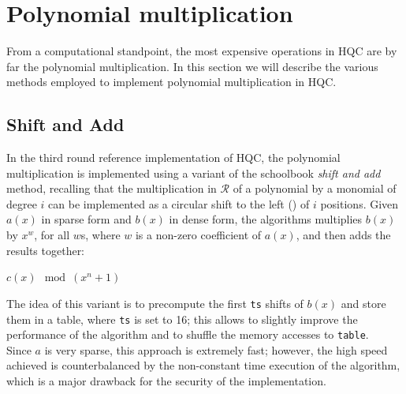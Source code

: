 \section{Polynomial multiplication}
From a computational standpoint, the most expensive operations in HQC are by far the polynomial multiplication.
In this section we will describe the various methods employed to implement polynomial multiplication in HQC.

	\subsection{Shift and Add}\label{subsec:shift_add}
		In the third round reference implementation of HQC, the polynomial multiplication is implemented using a variant of the schoolbook
		\textit{shift and add} method, recalling that the multiplication in $\mathcal{R}$ of a polynomial by a monomial of degree $i$ 
		can be implemented as a circular shift to the left (\clshift) 	of $i$ positions. Given $a(x)$ in sparse form and $b(x)$ in dense form, the algorithms multiplies $b(x)$ by $x^w$, 
		for all $w$s, where $w$ is a non-zero coefficient of $a(x)$, and then adds the results together:

		\begin{algorithm2e}[H]
			\caption{Sparse polynomial multiplication}
			\KwRet $c(x) \mod (x^n+1)$\;
		\end{algorithm2e}
		The idea of this variant is to precompute the first \texttt{ts} shifts of $b(x)$ and store them in a table, where \texttt{ts} is set to 16;
		this allows to slightly improve the performance of the algorithm and to shuffle the memory accesses to \texttt{table}.\\
		Since $a$ is very sparse, this approach is extremely fast; however, the high speed achieved is counterbalanced by the
		non-constant time execution of the algorithm, which is a major drawback for the security of the implementation. 

